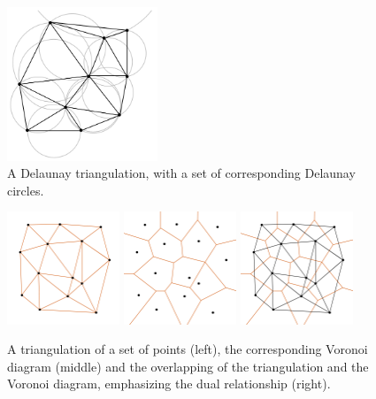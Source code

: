 \documentclass[a4paper,12pt]{article}
\begin{document}
\begin{figure}[hb]
\centering
\includegraphics[width=0.4\textwidth]{pictures/Delaunay_circumcircles.png}
 \caption[Close up of \textit{Hemidactylus} sp.]
{A Delaunay triangulation, with a set of corresponding Delaunay circles.}
\end{figure}



\begin{figure}[hb]
\centering
\includegraphics[width=0.3\textwidth]{pictures/Delaunay-Triangulation1.png}
\includegraphics[width=0.3\textwidth]{pictures/Delaunay-Triangulation2.png}
\includegraphics[width=0.3\textwidth]{pictures/Delaunay-Triangulation3.png}
 \caption[Close up of \textit{Hemidactylus} sp.]{
A triangulation of a set of points (left), the corresponding Voronoi diagram (middle) and the overlapping of the triangulation and the Voronoi diagram, emphasizing the dual relationship (right).}
\end{figure}
\end{document}
